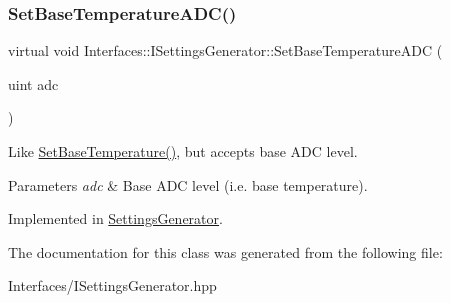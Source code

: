 \subsubsection{\texorpdfstring{Set\+Base\+Temperature\+A\+D\+C()}{SetBaseTemperatureADC()}}
{\footnotesize\ttfamily virtual void Interfaces\+::\+I\+Settings\+Generator\+::\+Set\+Base\+Temperature\+A\+DC (\begin{DoxyParamCaption}\item[{uint}]{adc }\end{DoxyParamCaption})\hspace{0.3cm}{\ttfamily [pure virtual]}}



Like \hyperlink{class_interfaces_1_1_i_settings_generator_a8b60ba05790994db0303b251f655e95d}{Set\+Base\+Temperature()}, but accepts base A\+DC level. 


\begin{DoxyParams}{Parameters}
{\em adc} & Base A\+DC level (i.\+e. base temperature). \\
\hline
\end{DoxyParams}


Implemented in \hyperlink{class_settings_generator_a806478b651a98ce128e97c2da385c302}{Settings\+Generator}.



The documentation for this class was generated from the following file\+:\begin{DoxyCompactItemize}
\item 
Interfaces/I\+Settings\+Generator.\+hpp\end{DoxyCompactItemize}
